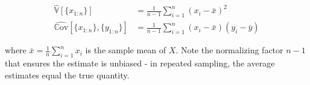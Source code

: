 \begin{equation}
\begin{aligned}
\hat{\mathbb{V}}[\{x_{1:n}\}] &= \frac{1}{n-1} \sum_{i=1}^n \left( x_i - \bar{x} \right)^2 \\
\hat{\mathbb{C}\text{ov}}[\{x_{1:n}\},\{y_{1:n}\}] &= \frac{1}{n-1} \sum_{i=1}^n ( x_i - \bar{x})(y_i - \bar{y})
\end{aligned}
\end{equation}

where $\bar{x} = \frac{1}{n} \sum_{i=1}^{n} x_i$ is the sample mean of $X$. Note the normalizing factor $n-1$ that ensures the estimate is unbiased - in repeated sampling, the average estimates equal the true quantity. 


